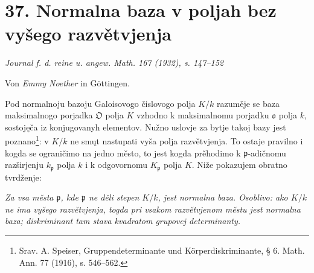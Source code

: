 \documentclass[11pt]{article}
\providecommand{\frakO}{\mathfrak{O}}
\providecommand{\frako}{\mathfrak{o}}
\providecommand{\frakp}{\mathfrak{p}}
\begin{document}
\section*{37. Normalna baza v poljah bez vyšego razvětvjenja}

\begin{center}
\emph{Journal f. d. reine u. angew. Math. 167 (1932), s. 147--152}
\end{center}

\begin{center}
Von \emph{Emmy Noether} in Göttingen.
\end{center}

Pod normalnoju bazoju Galoisovogo čislovogo polja \(K/k\) razuměje se baza maksimalnogo porjadka \(\frakO\) polja \(K\) vzhodno k maksimalnomu porjadku \(\frako\) polja \(k\), sostojęča iz konjugovanyh elementov. Nužno uslovje za bytje takoj bazy jest poznano\footnote{Srav. A. Speiser, Gruppendeterminante und Körperdiskriminante, § 6. Math. Ann. 77 (1916), s. 546--562.}: v \(K/k\) ne smųt nastupati vyša polja razvětvjenja. To ostaje pravilno i kogda se ograničimo na jedno město, to jest kogda prěhodimo k \(\frakp\)-adičnomu razširjenju \(k_\frakp\) polja \(k\) i k odgovornomu \(K_\frakp\) polja \(K\). Niže pokazujem obratno tvrdženje:

\emph{Za vsa města \(\frakp\), kde \(\frakp\) ne děli stepen \(K/k\), jest normalna baza. Osoblivo: ako \(K/k\) ne ima vyšego razvětvjenja, togda pri vsakom razvětvjenom městu jest normalna baza; diskriminant tam stava kvadratom grupovej determinanty.}
\end{document}

